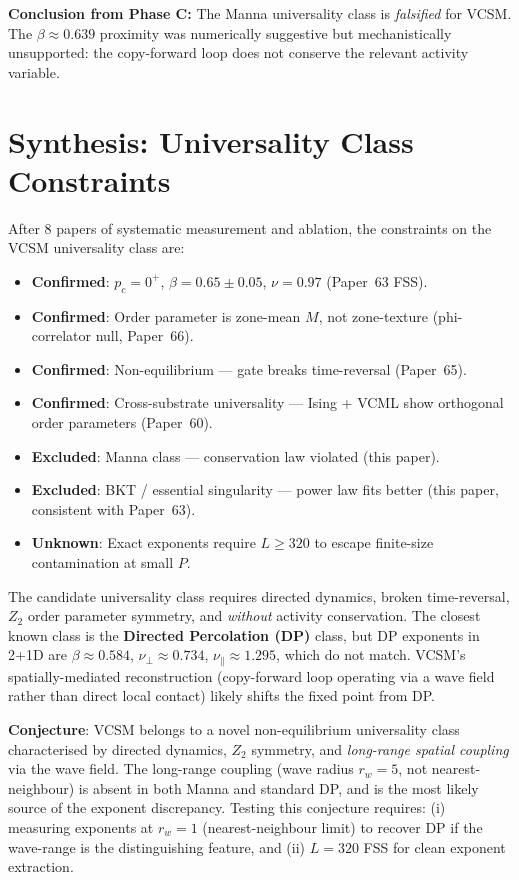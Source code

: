 \documentclass[twocolumn,10pt]{article}
\begin{document}
\textbf{Conclusion from Phase C:}
The Manna universality class is \emph{falsified} for VCSM.
The $\beta \approx 0.639$ proximity was numerically suggestive but mechanistically
unsupported: the copy-forward loop does not conserve the relevant activity variable.

\section{Synthesis: Universality Class Constraints}

After 8 papers of systematic measurement and ablation, the constraints on the
VCSM universality class are:

\begin{itemize}
  \item \textbf{Confirmed}: $p_c = 0^+$, $\beta = 0.65 \pm 0.05$, $\nu = 0.97$ (Paper~63 FSS).
  \item \textbf{Confirmed}: Order parameter is zone-mean $M$, not zone-texture
        (phi-correlator null, Paper~66).
  \item \textbf{Confirmed}: Non-equilibrium --- gate breaks time-reversal (Paper~65).
  \item \textbf{Confirmed}: Cross-substrate universality --- Ising + VCML show
        orthogonal order parameters (Paper~60).
  \item \textbf{Excluded}: Manna class --- conservation law violated (this paper).
  \item \textbf{Excluded}: BKT / essential singularity --- power law fits better (this paper,
        consistent with Paper~63).
  \item \textbf{Unknown}: Exact exponents require $L \geq 320$ to escape finite-size
        contamination at small $P$.
\end{itemize}

The candidate universality class requires directed dynamics, broken time-reversal,
$Z_2$ order parameter symmetry, and \emph{without} activity conservation.
The closest known class is the \textbf{Directed Percolation (DP)} class, but
DP exponents in 2+1D are $\beta \approx 0.584$, $\nu_\perp \approx 0.734$,
$\nu_\parallel \approx 1.295$, which do not match.
VCSM's spatially-mediated reconstruction (copy-forward loop operating via a wave
field rather than direct local contact) likely shifts the fixed point from DP.

\textbf{Conjecture}: VCSM belongs to a novel non-equilibrium universality class
characterised by directed dynamics, $Z_2$ symmetry, and \emph{long-range spatial
coupling} via the wave field.
The long-range coupling (wave radius $r_w = 5$, not nearest-neighbour) is
absent in both Manna and standard DP, and is the most likely source of the
exponent discrepancy.
Testing this conjecture requires: (i) measuring exponents at $r_w = 1$
(nearest-neighbour limit) to recover DP if the wave-range is the distinguishing
feature, and (ii) $L = 320$ FSS for clean exponent extraction.
\end{document}
